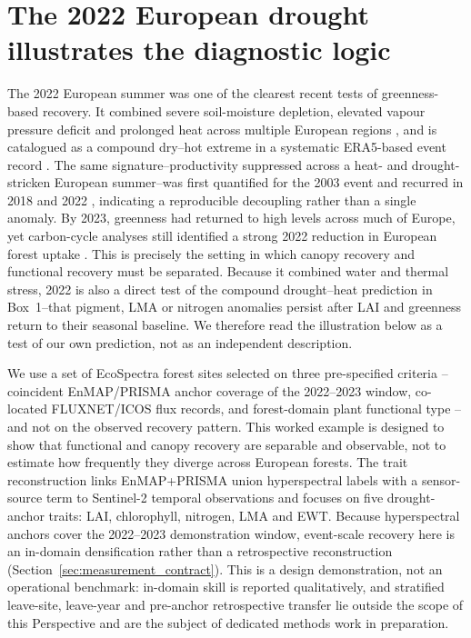 \documentclass[pdflatex,sn-mathphys-num]{sn-jnl}
\begin{document}
\section{The 2022 European drought illustrates the diagnostic logic}

The 2022 European summer was one of the clearest recent tests of greenness-based recovery. It combined severe soil-moisture depletion, elevated vapour pressure deficit and prolonged heat across multiple European regions \cite{toreti2022jrc,schumacher2022amplified,rakovec2022europe,vanderwoude2023carbon}, and is catalogued as a compound dry--hot extreme in a systematic ERA5-based event record \cite{weynants2025dheed}. The same signature--productivity suppressed across a heat- and drought-stricken European summer--was first quantified for the 2003 event \cite{ciais2005europe} and recurred in 2018 and 2022 \cite{bastos2023europe}, indicating a reproducible decoupling rather than a single anomaly. By 2023, greenness had returned to high levels across much of Europe, yet carbon-cycle analyses still identified a strong 2022 reduction in European forest uptake \cite{bastos2023europe,li2024greenness,vanderwoude2023carbon}. This is precisely the setting in which canopy recovery and functional recovery must be separated. Because it combined water and thermal stress, 2022 is also a direct test of the compound drought--heat prediction in Box~1--that pigment, LMA or nitrogen anomalies persist after LAI and greenness return to their seasonal baseline. We therefore read the illustration below as a test of our own prediction, not as an independent description.

We use a set of EcoSpectra forest sites selected on three pre-specified criteria -- coincident EnMAP/PRISMA anchor coverage of the 2022--2023 window, co-located FLUXNET/ICOS flux records, and forest-domain plant functional type -- and not on the observed recovery pattern. This worked example is designed to show that functional and canopy recovery are separable and observable, not to estimate how frequently they diverge across European forests. The trait reconstruction links EnMAP+PRISMA union hyperspectral labels with a sensor-source term to Sentinel-2 temporal observations and focuses on five drought-anchor traits: LAI, chlorophyll, nitrogen, LMA and EWT. Because hyperspectral anchors cover the 2022--2023 demonstration window, event-scale recovery here is an in-domain densification rather than a retrospective reconstruction (Section~\ref{sec:measurement_contract}). This is a design demonstration, not an operational benchmark: in-domain skill is reported qualitatively, and stratified leave-site, leave-year and pre-anchor retrospective transfer lie outside the scope of this Perspective and are the subject of dedicated methods work in preparation.
\end{document}
